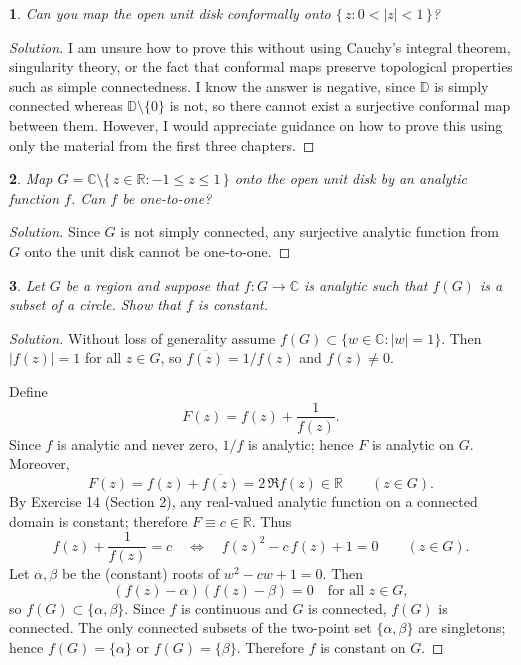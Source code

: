\documentclass[12pt, a4paper]{report}
\theoremstyle{spaced}
\newtheorem{exercise}{}
\newcommand{\setexercise}[1]{\setcounter{exercise}{#1-1}}
\begin{document}
\setexercise{15}
\begin{exercise}
	Can you map the open unit disk conformally onto \(\{\,z: 0<|z|<1\,\}\)?
\end{exercise}

\begin{proof}[Solution]
	I am unsure how to prove this without using Cauchy’s integral theorem, singularity theory, or the fact that conformal maps preserve topological properties such as simple connectedness. I know the answer is negative, since $\mathbb{D}$ is simply connected whereas $\mathbb{D}\setminus\{0\}$ is not, so there cannot exist a surjective conformal map between them.
	However, I would appreciate guidance on how to prove this using only the material from the first three chapters.
\end{proof}

\par\vspace{15em}


\setexercise{16}
\begin{exercise}
	Map \(G=\mathbb{C}\setminus\{\,z\in\mathbb{R}:-1\le z\le 1\,\}\) onto the open unit disk by an analytic function \(f\).
	Can \(f\) be one-to-one?
\end{exercise}

\begin{proof}[Solution]
	Since \(G\) is not simply connected, any surjective analytic function from \(G\) onto the unit disk cannot be one-to-one.
\end{proof}


\newpage

\setexercise{17}
\begin{exercise}
	Let \(G\) be a region and suppose that \(f:G\to\mathbb{C}\) is analytic such that \(f(G)\) is a subset of a circle.
	Show that \(f\) is constant.
\end{exercise}

\begin{proof}[Solution]
	Without loss of generality assume $f(G)\subset\{w\in\mathbb C:|w|=1\}$.
	Then $|f(z)|=1$ for all $z\in G$, so $\overline{f(z)}=1/f(z)$ and $f(z)\neq 0$.

	Define
	\[
		F(z)=f(z)+\frac{1}{f(z)}.
	\]
	Since $f$ is analytic and never zero, $1/f$ is analytic; hence $F$ is analytic on $G$.
	Moreover,
	\[
		F(z)=f(z)+\overline{f(z)}=2\,\Re f(z)\in \mathbb R\qquad(z\in G).
	\]
	By Exercise 14 (Section 2), any real-valued analytic function on a connected domain is constant; therefore $F\equiv c\in\mathbb R$.
	Thus
	\[
		f(z)+\frac{1}{f(z)}=c \quad\Longleftrightarrow\quad f(z)^2-c\,f(z)+1=0\qquad(z\in G).
	\]
	Let $\alpha,\beta$ be the (constant) roots of $w^2-cw+1=0$. Then
	\[
		(f(z)-\alpha)(f(z)-\beta)=0 \quad\text{for all }z\in G,
	\]
	so $f(G)\subset\{\alpha,\beta\}$.
	Since $f$ is continuous and $G$ is connected, $f(G)$ is connected. The only connected subsets of the two-point set $\{\alpha,\beta\}$ are singletons; hence $f(G)=\{\alpha\}$ or $f(G)=\{\beta\}$. Therefore $f$ is constant on $G$.
\end{proof}
\end{document}
